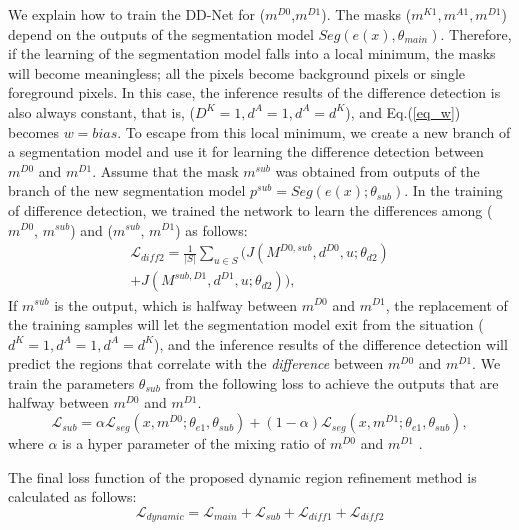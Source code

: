 \documentclass[10pt,twocolumn,letterpaper]{article}
\begin{document}
We explain how to train the DD-Net for ($m^{D0}$,$m^{D1}$).
The masks ($ m ^ {K1}, m ^ {A1}, m ^ {D1} $) depend on the outputs of the segmentation model $ Seg (e (x), \theta_ {main}) $.
Therefore, if the learning of the segmentation model falls into a  local minimum, the masks will become meaningless; all the pixels become background pixels or single foreground pixels.
In this case, the inference results of the difference detection is also always constant, 
that is, ($ D ^ {K} = 1, d ^ {A} = 1, d ^ {A} = d ^ {K } $), and Eq.(\ref{eq_w}) becomes $w=bias$. 
To escape from this local minimum, we create a new branch of a segmentation model and use it for learning the difference detection between $ m ^ {D0} $ and $ m^{D1} $.
Assume that the mask $ m^{sub}$ was obtained from outputs of the branch of the new segmentation model $ p ^ {sub} = Seg (e(x); \theta_{sub})$.
In the training of difference detection, we trained the network to learn the differences among ($ m^{D0} $, $m^{sub}$) and ($m^{sub} $, $m^{D1}$) as follows:
\begin{equation}
\begin{split}
{\mathcal L}_{\mathit{diff2}} = \frac{1}{|S|}\displaystyle{\sum_{u \in S}} (J(M^{D0,sub},d^{D0},u;\theta_{d2})\\
+ J(M^{sub,D1},d^{D1}, u;\theta_{d2})),
\end{split}
\end{equation}
If $m^{sub}$ is the output, which is halfway between $m^{D0}$ and $m^{D1}$, the replacement of the training samples will let the segmentation model exit from the situation ($d^{K}=1, d^{A} = 1, d^{A} = d^{K}$), and the inference results of the difference detection will predict the regions that correlate with the {\it difference} between $m^{D0}$ and $m^{D1}$.
We train the parameters $ \theta_{sub} $ from the following loss to achieve the outputs that are halfway between $m^{D0}$ and $m^{D1}$.
\begin{equation}
{\mathcal L}_{sub}= \alpha{\mathcal L}_{seg}(x, m^{D0};\theta_{e1}, \theta_{sub}) + (1-\alpha){\mathcal L}_{seg}(x, m^{D1};\theta_{e1}, \theta_{sub}),
\label{seedloss2}
\end{equation}
where $\alpha$ is a hyper parameter of the mixing ratio of $m^{D0}$ and $m^{D1}$ .

The final loss function of the proposed dynamic region refinement method is calculated as follows:
\begin{equation}
{\mathcal L}_{dynamic}={\mathcal L}_{main} + {\mathcal L}_{sub}+ {\mathcal L}_{\mathit{diff1}}+ {\mathcal L}_{\mathit{diff2}} 
\end{equation}
\end{document}
